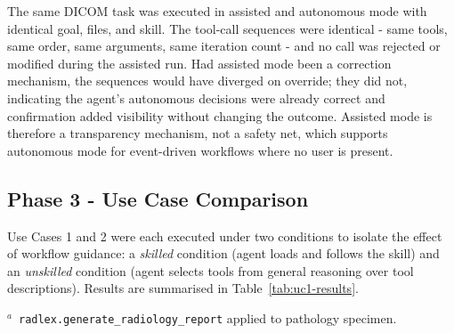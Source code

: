 \documentclass[1p,12pt]{elsarticle}
\begin{document}
The same DICOM task was executed in assisted and autonomous mode with identical goal, files, and skill. The tool-call sequences were identical - same tools, same order, same arguments, same iteration count - and no call was rejected or modified during the assisted run. Had assisted mode been a correction mechanism, the sequences would have diverged on override; they did not, indicating the agent's autonomous decisions were already correct and confirmation added visibility without changing the outcome. Assisted mode is therefore a transparency mechanism, not a safety net, which supports autonomous mode for event-driven workflows where no user is present.

\subsection{Phase 3  -  Use Case Comparison}
Use Cases 1 and 2 were each executed under two conditions to isolate the effect of workflow guidance: a \emph{skilled} condition (agent loads and follows the skill) and an \emph{unskilled} condition (agent selects tools from general reasoning over tool descriptions). %
Results are summarised in Table~\ref{tab:uc1-results}.

\begin{table}[H]
  \caption{Use Cases 1 and 2: Execution Metrics and Outcomes}
  \label{tab:uc1-results}
  \centering
  \par\smallskip
  \raggedright\footnotesize
  $^{a}$~\texttt{radlex.generate\_radiology\_report} applied to pathology specimen.
\end{table}
\end{document}
